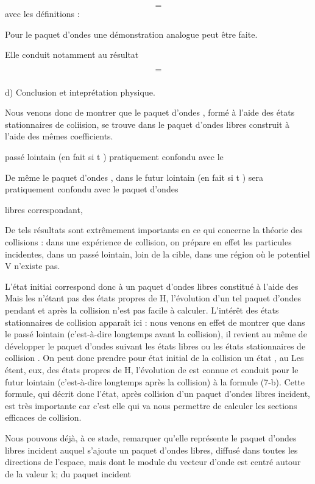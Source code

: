 {{{\[
\tag{472}=
\]
avec les définitions :

Pour le paquet d'ondes  une démonstration analogue peut être faite.

Elle conduit notamment au résultat

\[
\tag{48}=
\]

\subsubsection{}%
d) Conclusion et inteprétation physique.

Nous venons donc de montrer que le paquet d'ondes  ,
formé à l'aide des états stationnaires de coliision, se trouve dans le
paquet d'ondes libres  construit à l'aide des mêmes coefficients.

passé lointain (en fait si t ) pratiquement confondu avec le

De même le paquet d'ondes  , dans le futur lointain
(en fait si t  ) sera pratiquement confondu avec le paquet d'ondes

libres  correspondant,

De tels résultats sont extrêmement importants en ce qui concerne
la théorie des collisions : dans une expérience de collision, on prépare
en effet les particules incidentes, dans un passé lointain, loin de la
cible, dans une région où le potentiel V n'existe pas.

L'état initiai correspond donc à un paquet d'ondes libres
 constitué à l'aide des  Mais les  n'étant pas des
états propres de H, l'évolution d'un tel paquet d'ondes pendant et après
la collision n'est pas facile à calculer. L'intérêt des états stationnaires de
collision apparaît ici : nous venons en effet de montrer que dans
le passé lointain (c'est-à-dire longtemps avant la collision), il revient
au même de développer le paquet d'ondes suivant les états libres  ou
les états stationnaires de collision  . On peut donc prendre pour
état initial de la collision un état  , au  Les
 étent, eux, des états propres de H, l'évolution de  est
connue et conduit pour le futur lointain (c'est-à-dire longtemps après la
collision) à la formule (7-b). Cette formule, qui décrit donc l'état,
après collision d'un paquet d'ondes libres incident, est très importante
car c'est elle qui va nous permettre de calculer les sections efficaces
de collision.

Nous pouvons déjà, à ce stade, remarquer qu'elle représente le
paquet d'ondes libres incident auquel s'ajoute un paquet d'ondes libres,
diffusé dans toutes les directions de l'espace, mais dont le module du
vecteur d'onde est centré autour de la valeur k; du paquet incident

}}}
